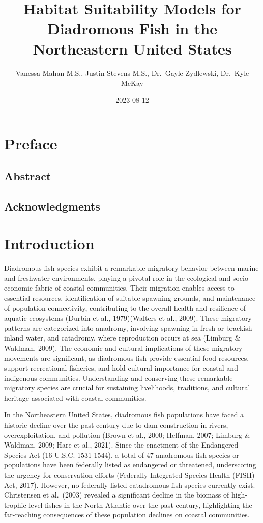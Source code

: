 \documentclass[
]{book}
\title{Habitat Suitability Models for Diadromous Fish in the Northeastern United States}
\author{Vanessa Mahan M.S., Justin Stevens M.S., Dr.~Gayle Zydlewski, Dr.~Kyle McKay}
\date{2023-08-12}
\begin{document}
\maketitle

{
\setcounter{tocdepth}{1}
\tableofcontents
}
\hypertarget{preface}{%
\chapter{Preface}\label{preface}}

\hypertarget{abstract}{%
\section{Abstract}\label{abstract}}

\hypertarget{acknowledgments}{%
\section{Acknowledgments}\label{acknowledgments}}

\hypertarget{introduction}{%
\chapter{Introduction}\label{introduction}}

Diadromous fish species exhibit a remarkable migratory behavior between marine and freshwater environments, playing a pivotal role in the ecological and socio-economic fabric of coastal communities. Their migration enables access to essential resources, identification of suitable spawning grounds, and maintenance of population connectivity, contributing to the overall health and resilience of aquatic ecosystems (Durbin et al., 1979)(Walters et al., 2009). These migratory patterns are categorized into anadromy, involving spawning in fresh or brackish inland water, and catadromy, where reproduction occurs at sea (Limburg \& Waldman, 2009). The economic and cultural implications of these migratory movements are significant, as diadromous fish provide essential food resources, support recreational fisheries, and hold cultural importance for coastal and indigenous communities. Understanding and conserving these remarkable migratory species are crucial for sustaining livelihoods, traditions, and cultural heritage associated with coastal communities.

In the Northeastern United States, diadromous fish populations have faced a historic decline over the past century due to dam construction in rivers, overexploitation, and pollution (Brown et al., 2000; Helfman, 2007; Limburg \& Waldman, 2009; Hare et al., 2021). Since the enactment of the Endangered Species Act (16 U.S.C. 1531-1544), a total of 47 anadromous fish species or populations have been federally listed as endangered or threatened, underscoring the urgency for conservation efforts (Federally Integrated Species Health (FISH) Act, 2017). However, no federally listed catadromous fish species currently exist. Christensen et al.~(2003) revealed a significant decline in the biomass of high-trophic level fishes in the North Atlantic over the past century, highlighting the far-reaching consequences of these population declines on coastal communities.
\end{document}
